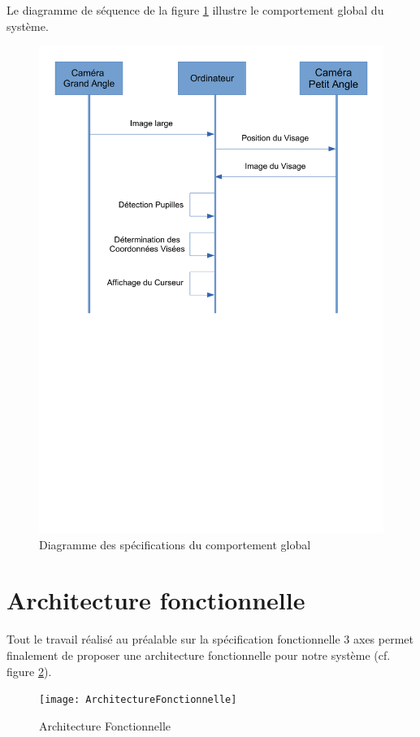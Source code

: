 Le diagramme de séquence de la figure \ref{fig:comportementGlobal} illustre le comportement global du système. 

\begin{figure}[H]
  \centering
  \includegraphics[scale=0.6]{comportementGlobal}
  \caption{Diagramme des spécifications du comportement global}
  \label{fig:comportementGlobal}
\end{figure}

\section{Architecture fonctionnelle}

Tout le travail réalisé au préalable sur la spécification fonctionnelle 3 axes permet finalement de proposer une architecture fonctionnelle pour notre système (cf. figure \ref{fig:archiFonctionnelle}).
 
\begin{figure}[H]
  \centering
  \texttt{[image: ArchitectureFonctionnelle]}
  \caption{Architecture Fonctionnelle}
  \label{fig:archiFonctionnelle}
\end{figure}

